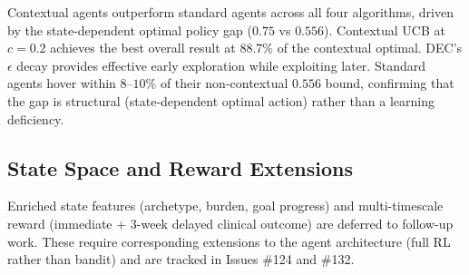 \documentclass[11pt]{article}
\begin{document}
Contextual agents outperform standard agents across all four algorithms, driven by the state-dependent optimal policy gap ($0.75$ vs $0.556$). Contextual UCB at $c=0.2$ achieves the best overall result at $88.7\%$ of the contextual optimal. DEC's $\epsilon$ decay provides effective early exploration while exploiting later. Standard agents hover within $8$--$10\%$ of their non-contextual $0.556$ bound, confirming that the gap is structural (state-dependent optimal action) rather than a learning deficiency.

\subsection{State Space and Reward Extensions}
Enriched state features (archetype, burden, goal progress) and multi-timescale reward (immediate + 3-week delayed clinical outcome) are deferred to follow-up work. These require corresponding extensions to the agent architecture (full RL rather than bandit) and are tracked in Issues \#124 and \#132.
\end{document}
